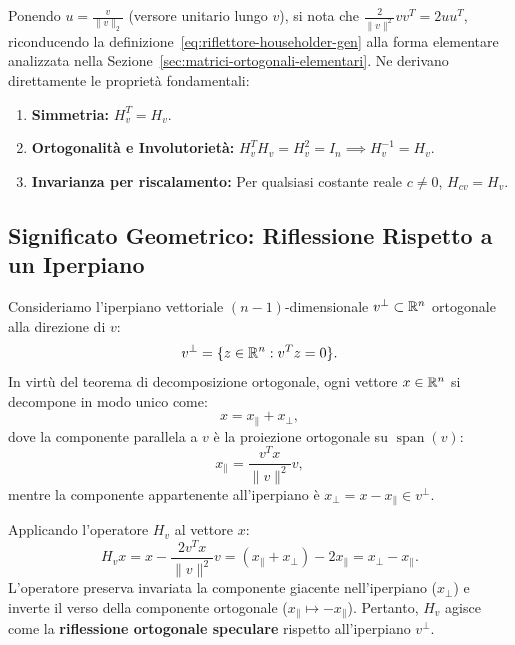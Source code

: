 Ponendo $u = \frac{v}{\|v\|_2}$ (versore unitario lungo $v$), si nota che $\frac{2}{\|v\|^2} v v^T = 2 u u^T$, riconducendo la definizione~\eqref{eq:riflettore-householder-gen} alla forma elementare analizzata nella Sezione~\ref{sec:matrici-ortogonali-elementari}. Ne derivano direttamente le propriet\`a fondamentali:
\begin{enumerate}
    \item \textbf{Simmetria:} $H_v^T = H_v$.
    \item \textbf{Ortogonalit\`a e Involutoriet\`a:} $H_v^T H_v = H_v^2 = I_n \implies H_v^{-1} = H_v$.
    \item \textbf{Invarianza per riscalamento:} Per qualsiasi costante reale $c \neq 0$, $H_{c v} = H_v$.
\end{enumerate}

\subsection{Significato Geometrico: Riflessione Rispetto a un Iperpiano}
Consideriamo l'iperpiano vettoriale $(n-1)$-dimensionale $v^\perp \subset \mathbb{R}^n$ ortogonale alla direzione di $v$:
\begin{equation}
    v^\perp = \{z \in \mathbb{R}^n : v^T z = 0\}.
\end{equation}
In virt\`u del teorema di decomposizione ortogonale, ogni vettore $x \in \mathbb{R}^n$ si decompone in modo unico come:
\begin{equation}
    x = x_\parallel + x_\perp,
\end{equation}
dove la componente parallela a $v$ \`e la proiezione ortogonale su $\operatorname{span}(v)$:
\begin{equation}
    x_\parallel = \frac{v^T x}{\|v\|^2} v,
\end{equation}
mentre la componente appartenente all'iperpiano \`e $x_\perp = x - x_\parallel \in v^\perp$.

Applicando l'operatore $H_v$ al vettore $x$:
\begin{equation}
    H_v x = x - \frac{2 v^T x}{\|v\|^2} v = (x_\parallel + x_\perp) - 2 x_\parallel = x_\perp - x_\parallel.
\end{equation}
L'operatore preserva invariata la componente giacente nell'iperpiano ($x_\perp$) e inverte il verso della componente ortogonale ($x_\parallel \mapsto -x_\parallel$). Pertanto, $H_v$ agisce come la \textbf{riflessione ortogonale speculare} rispetto all'iperpiano $v^\perp$.

